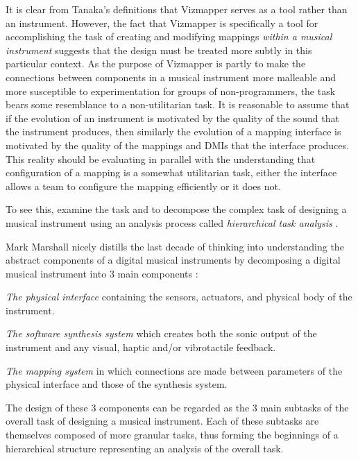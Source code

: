 It is clear from Tanaka's definitions that Vizmapper serves as a tool rather than an instrument. However, the fact that Vizmapper is specifically a tool for accomplishing the task of creating and modifying mappings \emph{within a musical instrument} suggests that the design must be treated more subtly in this particular context. As the purpose of Vizmapper is partly to make the connections between components in a musical instrument more malleable and more susceptible to experimentation for groups of non-programmers, the task bears some resemblance to a non-utilitarian task. It is reasonable to assume that if the evolution of an instrument is motivated by the quality of the sound that the instrument produces, then similarly the evolution of a mapping interface is motivated by the quality of the mappings and DMIs that the interface produces. This reality should be evaluating in parallel with the understanding that configuration of a mapping is a somewhat utilitarian task, either the interface allows a team to configure the mapping efficiently or it does not.

To see this, examine the task and to decompose the complex task of designing a musical instrument using an analysis process called \emph{hierarchical task analysis} \cite{annett1967}. 

Mark Marshall nicely distills the last decade of thinking into understanding the abstract components of a digital musical instruments by decomposing a digital musical instrument into 3 main components \cite{marshall2008}:

\begin{description}
\item \emph{The physical interface} containing the sensors, actuators, and physical body of the instrument.
\item \emph{The software synthesis system} which creates both the sonic output of the instrument and any visual, haptic and/or vibrotactile feedback.
\item \emph{The mapping system} in which connections are made between parameters of the physical interface and those of the synthesis system.
\end{description}

The design of these 3 components can be regarded as the 3 main subtasks of the overall task of designing a musical instrument. Each of these subtasks are themselves composed of more granular tasks, thus forming the beginnings of a hierarchical structure representing an analysis of the overall task.

